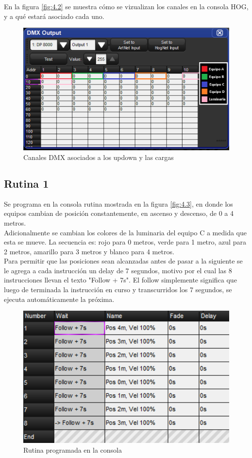 En la figura \ref{fig:4.2} se muestra cómo se vizualizan los canales en la consola HOG, y a qué estará asociado cada uno. 

\begin{figure}[!ht]
	\centering
	\includegraphics[width=15cm,scale=1]{resources/4_2-direccionamiento.png}
	\caption{Canales DMX asociados a los updown y las cargas}
	\label{fig:\thefigure}
\end{figure}

\subsection{Rutina 1}
Se programa en la consola rutina mostrada en la figura \ref{fig:4.3}, en donde los equipos cambian de posición constantemente, en ascenso y descenso, de 0 a 4 metros. \\
Adicionalmente se cambian los colores de la luminaria del equipo C a medida que esta se mueve. La secuencia es: rojo para 0 metros, verde para 1 metro, azul para 2 metros, amarillo para 3 metros y blanco para 4 metros.\\
Para permitir que las posiciones sean alcanzadas antes de pasar a la siguiente se le agrega a cada instrucción un delay de 7 segundos, motivo por el cual las 8 instrucciones llevan el texto "Follow + 7s". El follow simplemente significa que luego de terminada la instrucción en curso y transcurridos los 7 segundos, se ejecuta automáticamente la próxima.
	
\begin{figure}[!ht]
	\centering
	\includegraphics[width=12cm,scale=1]{resources/4_3-cuelist1.png}
	\caption{Rutina programada en la consola}
	\label{fig:\thefigure}
\end{figure}

